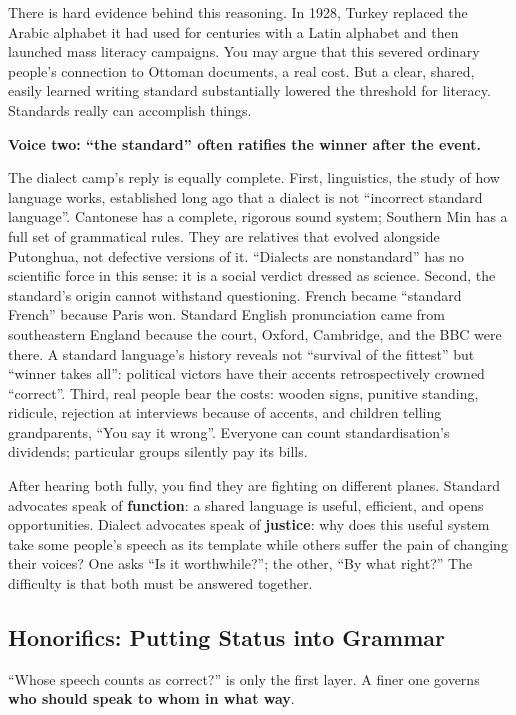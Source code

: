 There is hard evidence behind this reasoning. In 1928, Turkey replaced the Arabic alphabet it had used for centuries with a Latin alphabet and then launched mass literacy campaigns. You may argue that this severed ordinary people's connection to Ottoman documents, a real cost. But a clear, shared, easily learned writing standard substantially lowered the threshold for literacy. Standards really can accomplish things.

\textbf{Voice two: ``the standard'' often ratifies the winner after the event.}

The dialect camp's reply is equally complete. First, linguistics, the study of how language works, established long ago that a dialect is not ``incorrect standard language''. Cantonese has a complete, rigorous sound system; Southern Min has a full set of grammatical rules. They are relatives that evolved alongside Putonghua, not defective versions of it. ``Dialects are nonstandard'' has no scientific force in this sense: it is a social verdict dressed as science. Second, the standard's origin cannot withstand questioning. French became ``standard French'' because Paris won. Standard English pronunciation came from southeastern England because the court, Oxford, Cambridge, and the BBC were there. A standard language's history reveals not ``survival of the fittest'' but ``winner takes all'': political victors have their accents retrospectively crowned ``correct''. Third, real people bear the costs: wooden signs, punitive standing, ridicule, rejection at interviews because of accents, and children telling grandparents, ``You say it wrong''. Everyone can count standardisation's dividends; particular groups silently pay its bills.

After hearing both fully, you find they are fighting on different planes. Standard advocates speak of \textbf{function}: a shared language is useful, efficient, and opens opportunities. Dialect advocates speak of \textbf{justice}: why does this useful system take some people's speech as its template while others suffer the pain of changing their voices? One asks ``Is it worthwhile?''; the other, ``By what right?'' The difficulty is that both must be answered together.

\subsection{Honorifics: Putting Status into Grammar}
``Whose speech counts as correct?'' is only the first layer. A finer one governs \textbf{who should speak to whom in what way}.

